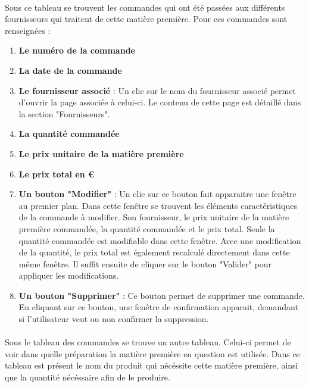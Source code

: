 \paragraph{}
Sous ce tableau se trouvent les commandes qui ont été passées aux différents 
fournisseurs qui traitent de cette matière première. Pour ces commandes sont 
renseignées :
\begin{enumerate}
  \item \textbf{Le numéro de la commande}
  \item \textbf{La date de la commande}
  \item \textbf{Le fournisseur associé} : Un clic sur le nom du fournisseur 
  associé permet d'ouvrir la page associée à celui-ci. Le contenu de cette page 
  est détaillé dans la section "Fournisseurs".
  \item \textbf{La quantité commandée}
  \item \textbf{Le prix unitaire de la matière première}
  \item \textbf{Le prix total en €}
  \item \textbf{Un bouton "Modifier"} : Un clic sur ce bouton fait apparaitre 
  une fenêtre au premier plan. Dans cette fenêtre se trouvent les éléments caractéristiques de la commande à modifier. Son fournisseur, le prix unitaire 
  de la matière première commandée, la quantité commandée et le prix total.
  Seule la quantité commandée est modifiable dans cette fenêtre. Avec une 
  modification de la quantité, le prix total est également recalculé 
  directement dans cette même fenêtre. Il suffit ensuite de cliquer sur le 
  bouton "Valider" pour appliquer les modifications.

  \item \textbf{Un bouton "Supprimer"} : Ce bouton permet de supprimer une 
  commande. En cliquant sur ce bouton, une fenêtre de confirmation apparait, 
  demandant si l'utilisateur veut ou non confirmer la suppression.
\end{enumerate}

\paragraph{}
Sous le tableau des commandes se trouve un autre tableau. Celui-ci permet de 
voir dans quelle préparation la matière première en question est utilisée. Dans 
ce tableau est présent le nom du produit qui nécéssite cette matière première, 
ainsi que la quantité nécéssaire afin de le produire.



